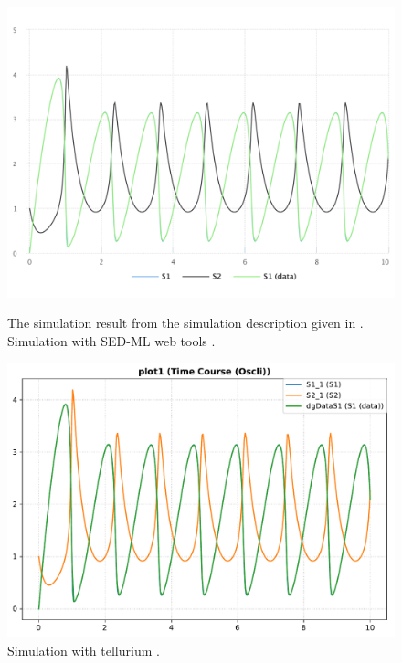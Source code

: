\begin{figure}[ht]
    \centering
    \begin{minipage}{0.47\textwidth}
        \centering
        \includegraphics[width=1.0\textwidth]{examples/plotting-data-numl/results/sedml_webtools/plot1}
        \caption{The simulation result from the simulation description given in . Simulation with SED-ML web tools \citep{bergmann2017sed}.}
    \end{minipage}\hfill
    \begin{minipage}{0.47\textwidth}
        \centering
        \includegraphics[width=1.0\textwidth]{examples/plotting-data-numl/results/tellurium/plot1}
        \caption{Simulation with tellurium \citep{tellurium}.}
    \end{minipage}
    \label{fig:plotting-data}
\end{figure}

